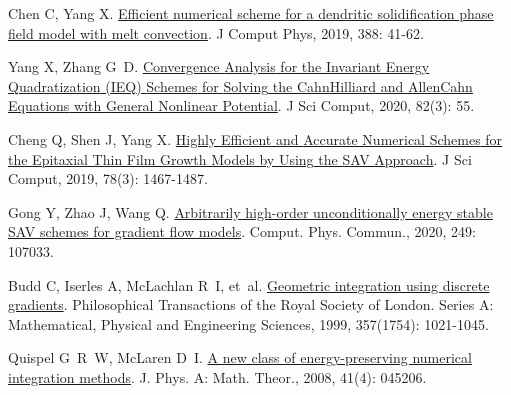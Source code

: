 \begin{thebibliography}{79}
    Chen C, Yang X.
    \newblock \href{https://www.sciencedirect.com/science/article/pii/S0021999119302001}{Efficient numerical scheme for a dendritic solidification phase field model with melt convection}\allowbreak[J].
    \newblock J Comput Phys, 2019, 388: 41-62.
    
    Yang X, Zhang G~D.
    \newblock \href{https://doi.org/10.1007/s10915-020-01151-x}{Convergence {{Analysis}} for the {{Invariant Energy Quadratization}} ({{IEQ}}) {{Schemes}} for {{Solving}} the {{Cahn}}{\textendash}{{Hilliard}} and {{Allen}}{\textendash}{{Cahn Equations}} with {{General Nonlinear Potential}}}\allowbreak[J].
    \newblock J Sci Comput, 2020, 82\allowbreak (3): 55.
    
    Cheng Q, Shen J, Yang X.
    \newblock \href{https://doi.org/10.1007/s10915-018-0832-5}{Highly {{Efficient}} and {{Accurate Numerical Schemes}} for the {{Epitaxial Thin Film Growth Models}} by {{Using}} the {{SAV Approach}}}\allowbreak[J].
    \newblock J Sci Comput, 2019, 78\allowbreak (3): 1467-1487.
    
    Gong Y, Zhao J, Wang Q.
    \newblock \href{https://www.sciencedirect.com/science/article/pii/S0010465519303716}{Arbitrarily high-order unconditionally energy stable {{SAV}} schemes for gradient flow models}\allowbreak[J].
    \newblock Comput. Phys. Commun., 2020, 249: 107033.
    
    Budd C, Iserles A, McLachlan R~I, et~al.
    \newblock \href{https://royalsocietypublishing.org/doi/10.1098/rsta.1999.0363}{Geometric integration using discrete gradients}\allowbreak[J].
    \newblock Philosophical Transactions of the Royal Society of London. Series A: Mathematical, Physical and Engineering Sciences, 1999, 357\allowbreak (1754): 1021-1045.
    
    Quispel G~R~W, McLaren D~I.
    \newblock \href{https://iopscience.iop.org/article/10.1088/1751-8113/41/4/045206}{A new class of energy-preserving numerical integration methods}\allowbreak[J].
    \newblock J. Phys. A: Math. Theor., 2008, 41\allowbreak (4): 045206.
    

\end{thebibliography}
